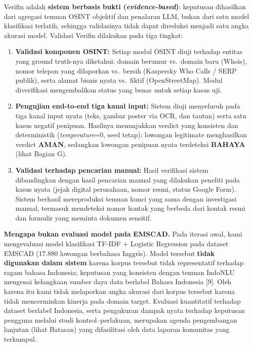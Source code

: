 \documentclass[12pt,a4paper]{article}
\begin{document}
Verifin adalah \textbf{sistem berbasis bukti (\textit{evidence-based})}: keputusan
dihasilkan dari agregasi temuan OSINT objektif dan penalaran LLM, bukan dari satu model
klasifikasi terlatih, sehingga validasinya tidak
dapat direduksi menjadi satu angka akurasi model. Validasi Verifin dilakukan pada tiga tingkat:

\begin{enumerate}[label=\textbf{\arabic*.}]
\item \textbf{Validasi komponen OSINT:} Setiap modul OSINT diuji terhadap entitas yang ground
truth-nya diketahui: domain berumur vs.\ domain baru (Whois), nomor telepon yang dilaporkan vs.\
bersih (Kaspersky Who Calls / SERP publik), serta alamat bisnis nyata vs.\ fiktif (OpenStreetMap).
Modul diverifikasi mengembalikan status yang benar untuk setiap kasus uji.

\item \textbf{Pengujian end-to-end tiga kanal input:} Sistem diuji menyeluruh pada tiga kanal input
nyata (teks, gambar poster via OCR, dan tautan) serta satu kasus negatif penipuan. Hasilnya
menunjukkan verdict yang konsisten dan deterministik (\textit{temperature}=0, seed tetap):
lowongan legitimate menghasilkan verdict \textbf{AMAN}, sedangkan lowongan penipuan nyata
terdeteksi \textbf{BAHAYA} (lihat Bagian G).

\item \textbf{Validasi terhadap pencarian manual:} Hasil verifikasi sistem dibandingkan dengan hasil
pencarian manual yang dilakukan peneliti pada kasus nyata (jejak digital perusahaan, nomor resmi,
status Google Form). Sistem berhasil mereproduksi temuan kunci yang sama dengan investigasi
manual, termasuk mendeteksi nomor kontak yang berbeda dari kontak resmi dan formulir yang meminta
dokumen sensitif.
\end{enumerate}

\textbf{Mengapa bukan evaluasi model pada EMSCAD.} Pada iterasi awal, kami mengevaluasi model
klasifikasi TF-IDF + Logistic Regression pada dataset EMSCAD (17.880 lowongan berbahasa Inggris).
Model tersebut \textbf{tidak digunakan dalam sistem} karena korpus
tersebut tidak representatif terhadap ragam bahasa Indonesia; keputusan yang konsisten dengan
temuan IndoNLU mengenai kelangkaan sumber daya data berlabel Bahasa Indonesia [9]. Oleh karena
itu kami tidak melaporkan angka akurasi dari korpus tersebut karena tidak mencerminkan kinerja
pada domain target. Evaluasi kuantitatif terhadap dataset berlabel Indonesia,
serta pengukuran dampak nyata terhadap keputusan pengguna melalui studi kontrol--perlakuan,
merupakan agenda pengembangan lanjutan (lihat Batasan) yang difasilitasi oleh data laporan
komunitas yang terkumpul.
\end{document}
